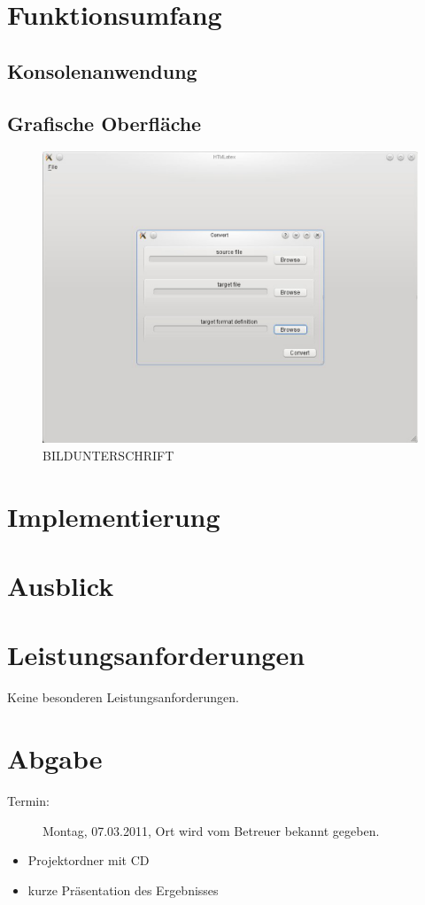 \documentclass[	a4paper,		%
		titlepage, 		%
		fontsize=12pt		%
		]{scrartcl} 		%
\begin{document}
\section{Funktionsumfang}

\subsection{Konsolenanwendung}

\subsection{Grafische Oberfläche}
\begin{figure} [H]
    \centering
	\includegraphics[width=.5\textwidth, keepaspectratio]{./img/screenshot.eps}
    \caption{BILDUNTERSCHRIFT}
\end{figure}

\section{Implementierung}
\begin{figure} [H]
\centering
\resizebox*{.70\textheight}{!}{}
\end{figure}
\section{Ausblick}




\section{Leistungsanforderungen}
Keine besonderen Leistungsanforderungen.

\section{Abgabe}
\begin{description}
 \item[Termin:] Montag, 07.03.2011, Ort wird vom Betreuer bekannt gegeben.
 \end{description}
\begin{itemize}
 \item Projektordner mit CD
 \item kurze Präsentation des Ergebnisses
\end{itemize}
\end{document}
